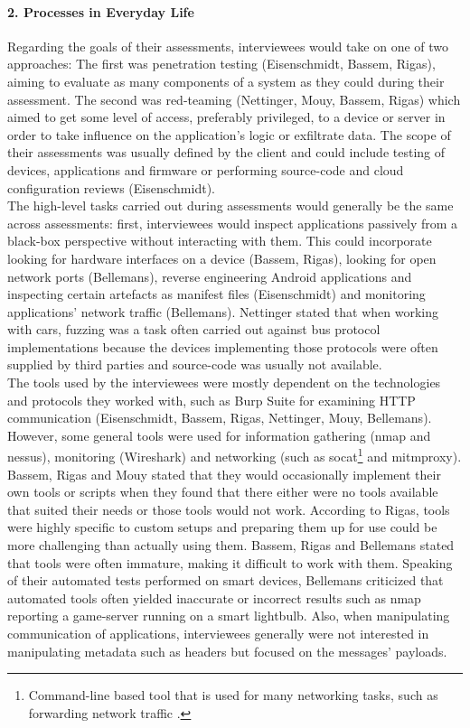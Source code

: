\paragraph{2. Processes in Everyday Life} Regarding the goals of their assessments, interviewees would take on one of two approaches: The first was penetration testing (Eisenschmidt, Bassem, Rigas), aiming to evaluate as many components of a system as they could during their assessment. The second was red-teaming (Nettinger, Mouy, Bassem, Rigas) which aimed to get some level of access, preferably privileged, to a device or server in order to take influence on the application's logic or exfiltrate data. The scope of their assessments was usually defined by the client and could include testing of devices, applications and firmware or performing source-code and cloud configuration reviews (Eisenschmidt).\\
The high-level tasks carried out during assessments would generally be the same across assessments: first, interviewees would inspect applications passively from a black-box perspective without interacting with them. This could incorporate looking for hardware interfaces on a device (Bassem, Rigas), looking for open network ports (Bellemans), reverse engineering Android applications and inspecting certain artefacts as manifest files (Eisenschmidt) and monitoring applications' network traffic (Bellemans). Nettinger stated that when working with cars, fuzzing was a task often carried out against bus protocol implementations because the devices implementing those protocols were often supplied by third parties and source-code was usually not available.\\
The tools used by the interviewees were mostly dependent on the technologies and protocols they worked with, such as Burp Suite for examining \ac{HTTP} communication (Eisenschmidt, Bassem, Rigas, Nettinger, Mouy, Bellemans). However, some general tools were used for information gathering (nmap and nessus), monitoring (Wireshark) and networking (such as socat\footnote{Command-line based tool that is used for many networking tasks, such as forwarding network traffic \cite{socat}.} and mitmproxy). Bassem, Rigas and Mouy stated that they would occasionally implement their own tools or scripts when they found that there either were no tools available that suited their needs or those tools would not work. According to Rigas, tools were highly specific to custom setups and preparing them up for use could be more challenging than actually using them. Bassem, Rigas and Bellemans stated that tools were often immature, making it difficult to work with them. Speaking of their automated tests performed on smart devices, Bellemans criticized that automated tools often yielded inaccurate or incorrect results such as nmap reporting a game-server running on a smart lightbulb. Also, when manipulating communication of applications, interviewees generally were not interested in manipulating metadata such as headers but focused on the messages' payloads.

